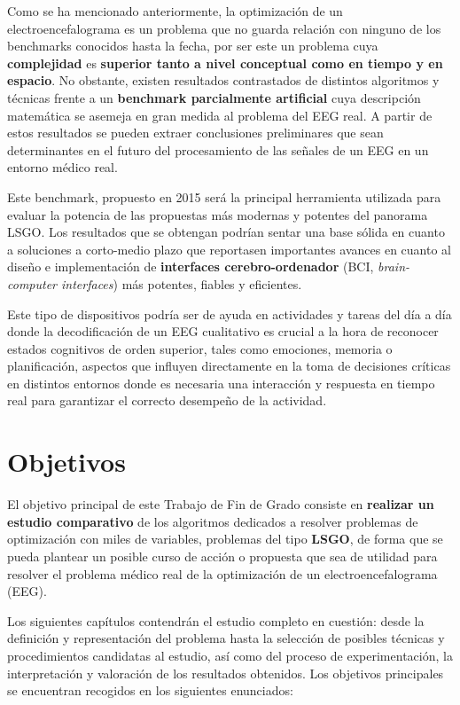 Como se ha mencionado anteriormente, la optimización de un electroencefalograma es un problema que no guarda relación con ninguno de los benchmarks conocidos hasta la fecha, por ser este un problema cuya \textbf{complejidad} es \textbf{superior tanto a nivel conceptual como en tiempo y en espacio}. No obstante, existen resultados contrastados de distintos algoritmos y técnicas frente a un \textbf{benchmark parcialmente artificial} cuya descripción matemática se asemeja en gran medida al problema del EEG real. A partir de estos resultados se pueden extraer conclusiones preliminares que sean determinantes en el futuro del procesamiento de las señales de un EEG en un entorno médico real.

Este benchmark, propuesto en 2015\cite{CompetitionBigOpt} será la principal herramienta utilizada para evaluar la potencia de las propuestas más modernas y potentes del panorama LSGO. Los resultados que se obtengan podrían sentar una base sólida en cuanto a soluciones a corto-medio plazo que reportasen importantes avances en cuanto al diseño e implementación de \textbf{interfaces cerebro-ordenador} (BCI, \textit{brain-computer interfaces}) más potentes, fiables y eficientes.

Este tipo de dispositivos podría ser de ayuda en actividades y tareas del día a día donde la decodificación de un EEG cualitativo es crucial a la hora de reconocer estados cognitivos de orden superior, tales como emociones, memoria o planificación, aspectos que influyen directamente en la toma de decisiones críticas\cite{EvolutionaryBigOpt} en distintos entornos donde es necesaria una interacción y respuesta en tiempo real para garantizar el correcto desempeño de la actividad.

\section{Objetivos}

El objetivo principal de este Trabajo de Fin de Grado consiste en \textbf{realizar un estudio comparativo} de los algoritmos dedicados a resolver problemas de optimización con miles de variables, problemas del tipo \textbf{LSGO}, de forma que se pueda plantear un posible curso de acción o propuesta que sea de utilidad para resolver el problema médico real de la optimización de un electroencefalograma (EEG).

Los siguientes capítulos contendrán el estudio completo en cuestión: desde la definición y representación del problema hasta la selección de posibles técnicas y procedimientos candidatas al estudio, así como del proceso de experimentación, la interpretación y valoración de los resultados obtenidos. Los objetivos principales se encuentran recogidos en los siguientes enunciados:

